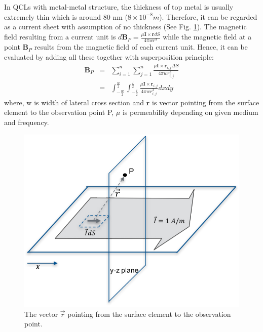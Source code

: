 \documentclass[11pt,final]{scrbook}
\begin{document}
In QCLs with metal-metal structure, the thickness of top metal is usually extremely thin which is around 80 nm ($8\times 10^{-8} m$). Therefore, it can be regarded as a current sheet with assumption of no thickness (See Fig. \ref{fig:TL_L(2)}). The magnetic field resulting from a current unit is $d\textbf{B}_{P}=\frac { \mu \textbf{I}\times { \textbf{r}}dS }{ 4\pi w{ r }^{ 3 }}$ while the magnetic field at a point $ \textbf{B}_{P}$ results from the magnetic field of each current unit. Hence, it can be evaluated by adding all these together with superposition principle:
\begin{eqnarray}
 \textbf{B}_{P} &=& \sum _{ i=1 }^{ n }{ \sum _{ j=1 }^{ n }{ \frac { \mu \textbf{I}\times { \textbf{r} }_{ i,j } \Delta S }{ 4\pi w{ r }_{ i,j }^{ 3 } }  }  } \\
 &=& \int _{ -\frac { w }{ 2 }  }^{ \frac { w }{ 2 }  }{ \int _{ -\frac { l }{ 2 }  }^{ \frac { l }{ 2 }  }{ { \frac { \mu { \textbf{I} }\times { { \textbf{r} } }_{ i,j } }{ 4\pi w{ r }_{ i,j }^{ 3 } }  } }  } dxdy \label{eq. TL_L}
 \end{eqnarray}
 where, w is width of lateral cross section and $\textbf{r}$ is vector pointing from the surface element to the observation point P, $\mu$ is permeability depending on given medium and frequency.

 \begin{figure}[htbp]
\begin{center}
\includegraphics[scale=0.9]{images/TL_L(2).pdf}
\caption{The vector $\vec{ r } $ pointing from the surface element to the observation point.}
\label{fig:TL_L(2)}
\end{center}
\end{figure}
\end{document}
